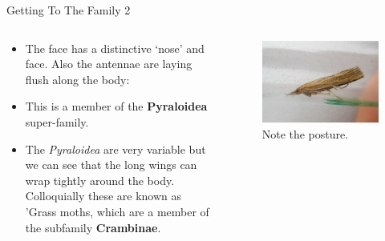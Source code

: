 \documentclass[
  ignorenonframetext,
]{beamer}
\providecommand{\tightlist}{%
  \setlength{\itemsep}{0pt}\setlength{\parskip}{0pt}}
\begin{document}
\begin{frame}{Getting To The Family 2}
\protect\hypertarget{getting-to-the-family-2}{}
\begin{columns}[T]
\begin{column}{0.5\textwidth}
\begin{itemize}
\tightlist
\item
  The face has a distinctive `nose' and face. Also the antennae are
  laying flush along the body:
\item
  This is a member of the \textbf{Pyraloidea} super-family.
\item
  The \emph{Pyraloidea} are very variable but we can see that the long
  wings can wrap tightly around the body. Colloquially these are known
  as 'Grass moths, which are a member of the subfamily
  \textbf{Crambinae}.
\end{itemize}
\end{column}

\begin{column}{0.5\textwidth}
\begin{figure}
\centering
\includegraphics{./images/Pcontaminella-PML-2021.jpg}
\caption{Note the posture.}
\end{figure}
\end{column}
\end{columns}
\end{frame}
\end{document}
